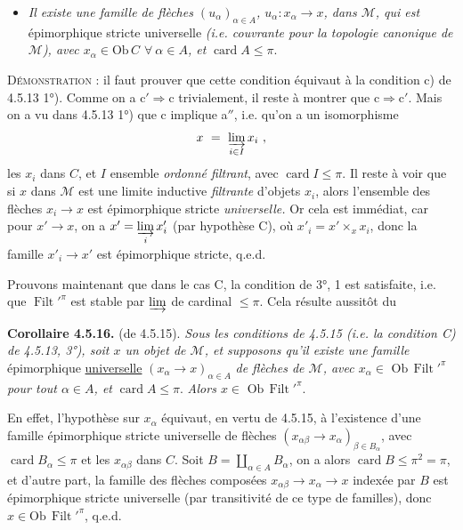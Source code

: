 \documentclass[11pt]{article}
\newcommand{\printedpage}[1]{\if\relax\detokenize{#1}\relax\else\marginpar{\footnotesize p.~#1}\fi}
\newcommand{\msp}[1]{\marginpar{\footnotesize [#1]}}
\newcommand{\Ob}{\mathrm{Ob}\,}
\newcommand{\card}{\operatorname{card}}
\newcommand{\Filt}{\operatorname{Filt}}
\begin{document}
\printedpage{43}
\begin{itemize}
\item[\textit{c$'$)}] \textit{Il existe une famille de flèches $(u_{\alpha})_{\alpha\in A}$, $u_{\alpha} : x_{\alpha} \longrightarrow x$, dans $\mathcal{M}$, qui est} épimorphique stricte universelle \textit{(i.e. couvrante pour la topologie canonique de $\mathcal{M}$), avec $x_{\alpha} \in \Ob C$ $\forall\ \alpha \in A$, et} $\card A \leqslant \pi$.
\end{itemize}
\textsc{Démonstration} : il faut prouver que cette condition équivaut à la condition c) de 4.5.13 1°). Comme on a $\mathrm{c}' \Longrightarrow \mathrm{c}$ trivialement, il reste à montrer que $\mathrm{c} \Longrightarrow \mathrm{c}'$. Mais on a vu dans 4.5.13 1°) que c implique a$''$, i.e. qu'on a un isomorphisme
\[ x \ = \ \varinjlim_{i\in I} x_i \ , \]
les $x_i$ dans $C$, et $I$ ensemble \textit{ordonné filtrant}, avec $\card I \leqslant \pi$. Il reste à voir que si $x$ dans $\mathcal{M}$ est une limite inductive \textit{filtrante} d'objets $x_i$, alors l'ensemble des flèches $x_i \longrightarrow x$ est épimorphique stricte \textit{universelle.} Or cela est immédiat, car pour $x' \longrightarrow x$, on a $x' = \varinjlim\limits_{i} x'_i$ (par hypothèse C), où $x'_i = x' \times_x x_i$, donc la famille $x'_i \longrightarrow x'$ est épimorphique stricte, q.e.d.

Prouvons maintenant que dans le cas C, la condition de 3°, 1 est satisfaite, i.e. que $\Filt'^{\pi}$ est stable par $\varinjlim$ de cardinal $\leqslant \pi$. Cela
\msp{page 137}
résulte aussitôt du

\textbf{Corollaire 4.5.16.} (de 4.5.15). \textit{Sous les conditions de 4.5.15 (i.e. la condition C) de 4.5.13, 3°), soit $x$ un objet de $\mathcal{M}$, et supposons qu'il existe une famille} épimorphique \underline{universelle} $(x_{\alpha} \longrightarrow x)_{\alpha\in A}$ \textit{de flèches de $\mathcal{M}$, avec $x_{\alpha} \in$} $\Ob \Filt'^{\pi}$ \textit{pour tout $\alpha \in A$, et} $\card A \leqslant \pi$. \textit{Alors $x \in$} $\Ob \Filt'^{\pi}$.

En effet, l'hypothèse sur $x_{\alpha}$ équivaut, en vertu de 4.5.15, à l'existence d'une famille épimorphique stricte universelle de flèches $(x_{\alpha\beta} \longrightarrow x_{\alpha})_{\beta\in B_{\alpha}}$, avec $\card B_{\alpha} \leqslant \pi$ et les $x_{\alpha\beta}$ dans $C$. Soit $B = \coprod_{\alpha\in A} B_{\alpha}$, on a alors $\card B \leqslant \pi^2 = \pi$, et d'autre part, la famille des flèches composées $x_{\alpha\beta} \longrightarrow x_{\alpha} \longrightarrow x$ indexée par $B$ est épimorphique stricte universelle (par transitivité de ce type de familles), donc $x \in \Ob \Filt'^{\pi}$, q.e.d.
\end{document}
